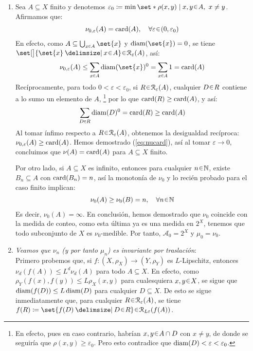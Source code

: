 \begin{sol}
\begin{enumerate}[label = (\roman*), leftmargin=1.5em]
\item %
Sea $A\subseteq X$ finito y denotemos $\varepsilon_0 \coloneq \min\set*{\rho(x,y) \mid x,y \en A,\ x \neq y}$. Afirmamos que:
\begin{equation}\label{eq:nucard}
\nu_{0,\varepsilon}(A) = \card(A), 
\quad \forall\varepsilon\en(0,\varepsilon_0)
\end{equation}
En efecto, como $A \subseteq \bigcup_{x \en A} \set{x}$ y $\diam(\set{x}) = 0$, se tiene $\set[\big]{\set{x} \given x\en A} \en \mathcal{R}_{\varepsilon}(A)$, así:
\[
\nu_{0,\varepsilon}(A)
\le \sum_{x \en A} \diam(\set{x})^0
=\sum_{x \en A} 1 
= \card(A)
\]
Recíprocamente, para todo $0<\varepsilon < \varepsilon_0$, si $R \en \mathcal{R}_\varepsilon(A)$, cualquier $D\en R$ contiene a lo sumo un elemento de $A$,%
\footnote{
    En efecto, pues en caso contrario, habrían $x,y\en A \cap D$ con $x\neq y$, de donde se seguiría que $\rho(x,y) \ge \varepsilon_0$. Pero esto contradice que $\operatorname{diam}(D) < \varepsilon < \varepsilon_0$.
}
por lo que $\operatorname{card}(R) \ge \operatorname{card}(A)$, y así:
\[
\sum_{D\en R} \diam(D)^0 = \card(R) \ge \card(A)
\]
Al tomar ínfimo respecto a $R\en\mathcal{R}_\varepsilon(A)$, obtenemos la desigualdad recíproca: $\nu_{0,\varepsilon}(A) \ge \operatorname{card}(A)$.
Hemos demostrado (\ref{eq:nucard}), así al tomar $\varepsilon \to 0$, concluimos que $\nu(A) = \operatorname{card}(A)$ para $A\subseteq X$ finito.\par
Por otro lado, si $A \subseteq X$ es infinito, entonces para cualquier $n\en\mathbb{N}$, existe $B_n \subseteq A$ con $\operatorname{card}(B_n) = n$, así la monotonía de $\nu_0$ y lo recién probado para el caso finito implican:
\[
\nu_0(A) \ge \nu_0(B) = n, \quad\forall n\en\mathbb{N}
\]
Es decir, $\nu_0(A) = \infty$. En conclusión, hemos demostrado que $\nu_0$ coincide con la medida de conteo, como esta última ya es una medida en $2^X$, tenemos que todo subconjunto de $X$ es $\nu_0$-medible. Por tanto, $\mathcal{A}_0 = 2^X$ y $\mu_0 = \nu_0$.
\item %
\emph{Veamos que $\nu_n$ (y por tanto $\mu_n$) es invariante por traslación}:\\
Primero probemos que, si $f\colon (X,\rho_X) \to (Y,\rho_Y)$ es $L$-Lipschitz, entonces $\nu_d(f(A)) \le L^d\nu_d(A)$ para todo $A\subseteq X$.
En efecto, como $\rho_Y(f(x), f(y)) \le L\rho_X(x, y)$ para cualesquiera $x, y \en X$, se sigue que $\operatorname{diam}(f(D)) \le L \operatorname{diam}(D)$ para cualquier $D\subseteq X$. De esto se sigue inmediatamente que, para cualquier $R\en\mathcal{R}_{\varepsilon}(A)$, se tiene $f(R) \coloneq \set{f(D) \given D\en R} \en \mathcal{R}_{L\varepsilon}(f(A))$. 

\end{enumerate}
\end{sol}
